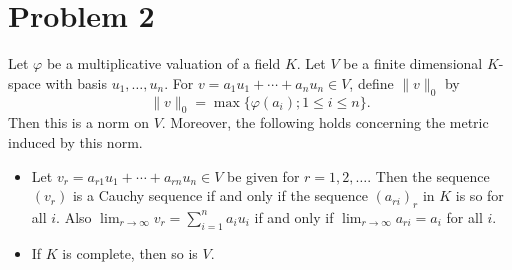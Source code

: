 \documentclass[12pt, a4paper]{article}
\theoremstyle{remark}
\begin{document}
\section*{Problem 2}

Let $\varphi$ be a multiplicative valuation of a field $K$. Let $V$ be a finite dimensional $K$-space with basis $u_1, \ldots, u_n$. For $v = a_1 u_1 + \cdots + a_n u_n \in V$, define $\|v\|_0$ by
$$\|v\|_0 = \max\{\varphi(a_i); 1 \leq i \leq n\}.$$
Then this is a norm on $V$. Moreover, the following holds concerning the metric induced by this norm.
\begin{itemize}
    \item[(i)] Let $v_r = a_{r1}u_1 + \cdots + a_{rn}u_n \in V$ be given for $r = 1, 2, \ldots$. Then the sequence $(v_r)$ is a Cauchy sequence if and only if the sequence $(a_{ri})_r$ in $K$ is so for all $i$. Also $\lim_{r\to\infty} v_r = \sum_{i=1}^n a_i u_i$ if and only if $\lim_{r\to\infty} a_{ri} = a_i$ for all $i$.
    \item[(ii)] If $K$ is complete, then so is $V$.
\end{itemize}
\end{document}
